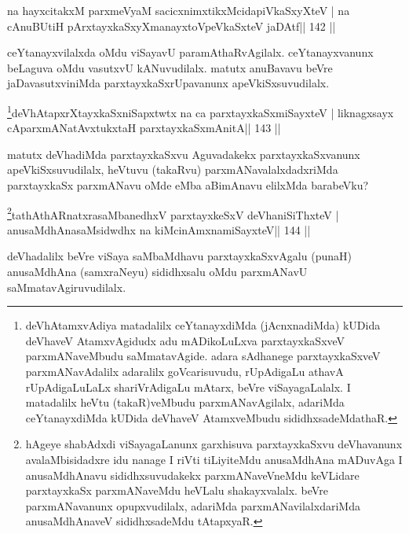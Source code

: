 \begin{shl}
na hayxcitakxM parxmeVyaM sacicxnimxtikxMcidapiVkaSxyXteV |
na cAnuBUtiH pArxtayxkaSxyXmanayxtoV\s peVkaSxteV jaDAtf\hfill || 142 ||
\end{shl}

\begin{artha}
ceYtanayxvilalxda oMdu viSayavU paramAthaRvAgilalx. ceYtanayxvanunx  beLaguva oMdu vasutxvU kANuvudilalx. matutx anuBavavu beVre jaDavasutxviniMda parxtayxkaSxrUpavanunx apeVkiSxsuvudilalx.
\end{artha}

\begin{shl}
\footnote{deVhAtamxvAdiya matadalilx ceYtanayxdiMda  (jAcnxnadiMda) kUDida deVhaveV AtamxvAgidudx adu mADikoLuLxva  parxtayxkaSxveV parxmANaveMbudu saMmatavAgide. adara sAdhanege  parxtayxkaSxveV parxmANavAdalilx adaralilx goVcarisuvudu, rUpAdigaLu  athavA rUpAdigaLuLaLx shariVrAdigaLu mAtarx, beVre viSayagaLalalx. I matadalilx heVtu (takaR)veMbudu parxmANavAgilalx, adariMda ceYtanayxdiMda kUDida deVhaveV AtamxveMbudu sididhxsadeMdathaR.}deVhAtapxrXtayxkaSxniSapxtwtx na ca parxtayxkaSxmiSayxteV |
liknagxsayx cAparxmANatAvxtukxtaH  parxtayxkaSxmAnitA\hfill || 143 ||
\end{shl}

\begin{artha}
matutx deVhadiMda parxtayxkaSxvu Aguvadakekx parxtayxkaSxvanunx apeVkiSxsuvudilalx, heVtuvu (takaRvu) parxmANavalalxdadxriMda parxtayxkaSx parxmANavu oMde eMba aBimAnavu elilxMda barabeVku?
\end{artha}

\begin{shl}
\footnote{hAgeye shabAdxdi viSayagaLanunx garxhisuva  parxtayxkaSxvu deVhavanunx avalaMbisidadxre idu nanage I riVti  tiLiyiteMdu anusaMdhAna mADuvAga I anusaMdhAnavu sididhxsuvudakekx  parxmANaveVneMdu keVLidare parxtayxkaSx parxmANaveMdu heVLalu shakayxvalalx. beVre parxmANavanunx opupxvudilalx, adariMda parxmANavilalxdariMda anusaMdhAnaveV sididhxsadeMdu tAtapxyaR.}tathA\s thARnatxrasaMbanedhxV parxtayxkeSxV deVhaniSiThxteV |
anusaMdhAnasaMsidwdhx na kiMcinAmxnamiSayxteV\hfill || 144 ||
\end{shl}

\begin{artha}
deVhadalilx beVre viSaya saMbaMdhavu parxtayxkaSxvAgalu (punaH) 
anusaMdhAna (samxraNeyu) sididhxsalu oMdu parxmANavU saMmatavAgiruvudilalx. 
\end{artha}


